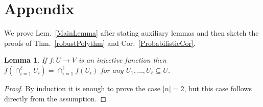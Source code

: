 \documentclass[9pt,twocolumn]{pnas-new}
\newtheorem{lemma}{Lemma}
\begin{document}
\section{Appendix}\label{proofs}

We prove Lem.~\ref{MainLemma} after stating auxiliary lemmas and then sketch the proofs of Thm.~\ref{robustPolythm} and Cor.~\ref{ProbabilisticCor}.


\begin{lemma}\label{spanIntersectionLemma}
If $f: U \to V$ is an injective function then $f\left(\cap_{i=1}^\ell U_i \right) =  \cap_{i=1}^\ell f\left(U_i\right)$ for any $U_1, \ldots, U_\ell \subseteq U$.
\end{lemma}
\begin{proof}
By induction it is enough to prove the case $|n| = 2$, but this case follows directly from the assumption. %
\end{proof}
\end{document}
